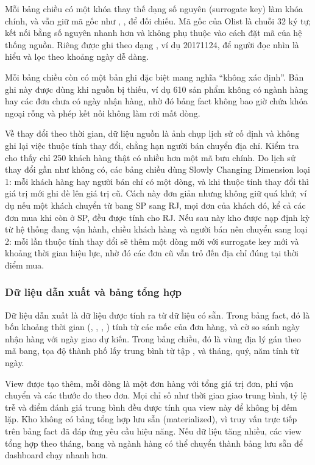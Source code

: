 Mỗi bảng chiều có một khóa thay thế dạng số nguyên (surrogate key) làm khóa chính, và vẫn giữ mã gốc như , ,  để đối chiếu. Mã gốc của Olist là chuỗi 32 ký tự; kết nối bằng số nguyên nhanh hơn và không phụ thuộc vào cách đặt mã của hệ thống nguồn. Riêng  được ghi theo dạng , ví dụ 20171124, để người đọc nhìn là hiểu và lọc theo khoảng ngày dễ dàng.

Mỗi bảng chiều còn có một bản ghi đặc biệt mang nghĩa ``không xác định''. Bản ghi này được dùng khi nguồn bị thiếu, ví dụ 610 sản phẩm không có ngành hàng hay các đơn chưa có ngày nhận hàng, nhờ đó bảng fact không bao giờ chứa khóa ngoại rỗng và phép kết nối không làm rơi mất dòng.

Về thay đổi theo thời gian, dữ liệu nguồn là ảnh chụp lịch sử cố định và không ghi lại việc thuộc tính thay đổi, chẳng hạn người bán chuyển địa chỉ. Kiểm tra cho thấy chỉ 250 khách hàng thật có nhiều hơn một mã bưu chính. Do lịch sử thay đổi gần như không có, các bảng chiều dùng Slowly Changing Dimension loại 1: mỗi khách hàng hay người bán chỉ có một dòng, và khi thuộc tính thay đổi thì giá trị mới ghi đè lên giá trị cũ. Cách này đơn giản nhưng không giữ quá khứ; ví dụ nếu một khách chuyển từ bang SP sang RJ, mọi đơn của khách đó, kể cả các đơn mua khi còn ở SP, đều được tính cho RJ. Nếu sau này kho được nạp định kỳ từ hệ thống đang vận hành, chiều khách hàng và người bán nên chuyển sang loại 2: mỗi lần thuộc tính thay đổi sẽ thêm một dòng mới với surrogate key mới và khoảng thời gian hiệu lực, nhờ đó các đơn cũ vẫn trỏ đến địa chỉ đúng tại thời điểm mua.

\subsubsection{Dữ liệu dẫn xuất và bảng tổng hợp}

Dữ liệu dẫn xuất là dữ liệu được tính ra từ dữ liệu có sẵn. Trong bảng fact, đó là bốn khoảng thời gian (, , , ) tính từ các mốc của đơn hàng, và cờ  so sánh ngày nhận hàng với ngày giao dự kiến. Trong bảng chiều, đó là vùng địa lý gán theo mã bang, tọa độ thành phố lấy trung bình từ tập , và tháng, quý, năm tính từ ngày.

View  được tạo thêm, mỗi dòng là một đơn hàng với tổng giá trị đơn, phí vận chuyển và các thước đo theo đơn. Mọi chỉ số như thời gian giao trung bình, tỷ lệ trễ và điểm đánh giá trung bình đều được tính qua view này để không bị đếm lặp. Kho không có bảng tổng hợp lưu sẵn (materialized), vì truy vấn trực tiếp trên bảng fact đã đáp ứng yêu cầu hiệu năng. Nếu dữ liệu tăng nhiều, các view tổng hợp theo tháng, bang và ngành hàng có thể chuyển thành bảng lưu sẵn để dashboard chạy nhanh hơn.


